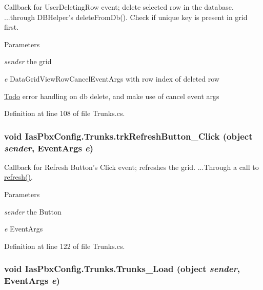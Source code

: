 Callback for UserDeletingRow event; delete selected row in the database. ...through DBHelper's deleteFromDb(). Check if unique key is present in grid first.


\begin{DoxyParams}{Parameters}
\item[{\em sender}]the grid \item[{\em e}]DataGridViewRowCancelEventArgs with row index of deleted row \end{DoxyParams}
\begin{Desc}
\item[\hyperlink{todo__todo000052}{Todo}]error handling on db delete, and make use of cancel event args \end{Desc}


Definition at line 108 of file Trunks.cs.\hypertarget{class_ias_pbx_config_1_1_trunks_ac79232f97537a0549ea51b8c2c2cd775}{
\subsubsection[{trkRefreshButton\_\-Click}]{\setlength{\rightskip}{0pt plus 5cm}void IasPbxConfig.Trunks.trkRefreshButton\_\-Click (object {\em sender}, \/  EventArgs {\em e})}}
\label{class_ias_pbx_config_1_1_trunks_ac79232f97537a0549ea51b8c2c2cd775}


Callback for Refresh Button's Click event; refreshes the grid. ...Through a call to \hyperlink{class_ias_pbx_config_1_1_trunks_a6499b1bd73dbd347476a9e2df5538691}{refresh()}. 
\begin{DoxyParams}{Parameters}
\item[{\em sender}]the Button \item[{\em e}]EventArgs \end{DoxyParams}


Definition at line 122 of file Trunks.cs.\hypertarget{class_ias_pbx_config_1_1_trunks_a966dcab2782c249c4dc9728bc90c627e}{
\subsubsection[{Trunks\_\-Load}]{\setlength{\rightskip}{0pt plus 5cm}void IasPbxConfig.Trunks.Trunks\_\-Load (object {\em sender}, \/  EventArgs {\em e})}}
\label{class_ias_pbx_config_1_1_trunks_a966dcab2782c249c4dc9728bc90c627e}



